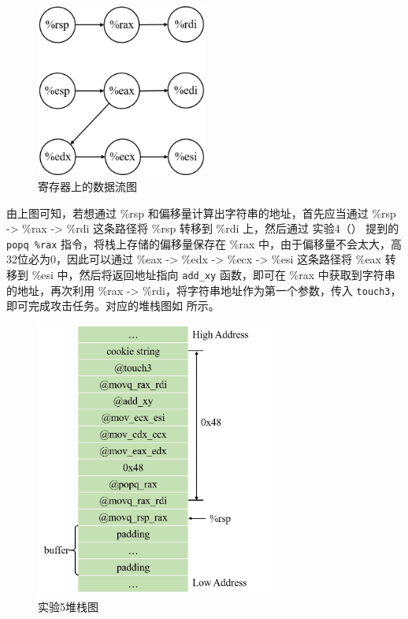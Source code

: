 \documentclass[12pt,a4paper]{article}
\begin{document}
\begin{figure}[H]
    \centering
    \includegraphics[width=0.5\textwidth]{./fig/mov_dag.png}
    \caption{寄存器上的数据流图}
    \label{figure:mov_dag}
\end{figure}

由上图可知，若想通过 \%rsp 和偏移量计算出字符串的地址，首先应当通过 \%rsp -> \%rax -> \%rdi 这条路径将 \%rsp 转移到 \%rdi 上，然后通过 实验4（） 提到的 \verb|popq %rax| 指令，将栈上存储的偏移量保存在 \%rax 中，由于偏移量不会太大，高32位必为0，因此可以通过 \%eax -> \%edx -> \%ecx -> \%esi 这条路径将 \%eax 转移到 \%esi 中，然后将返回地址指向 \verb|add_xy| 函数，即可在 \%rax 中获取到字符串的地址，再次利用 \%rax -> \%rdi，将字符串地址作为第一个参数，传入 \verb|touch3|，即可完成攻击任务。对应的堆栈图如  所示。

\begin{figure}[H]
    \hspace{85pt}
    \includegraphics[width=0.7\textwidth]{./fig/5.png}
    \caption{实验5堆栈图}
    \label{figure:exp_5}
\end{figure}
\end{document}
